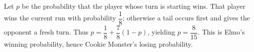 Let $p$ be the probability that the player whose turn is starting wins. That player wins the current run with probability $\dfrac{1}{8}$; otherwise a tail occurs first and gives the opponent a fresh turn. Thus $p=\dfrac{1}{8}+\dfrac{7}{8}(1-p)$, yielding $\boxed{p=\dfrac{8}{15}}$. This is Elmo's winning probability, hence Cookie Monster's losing probability.
